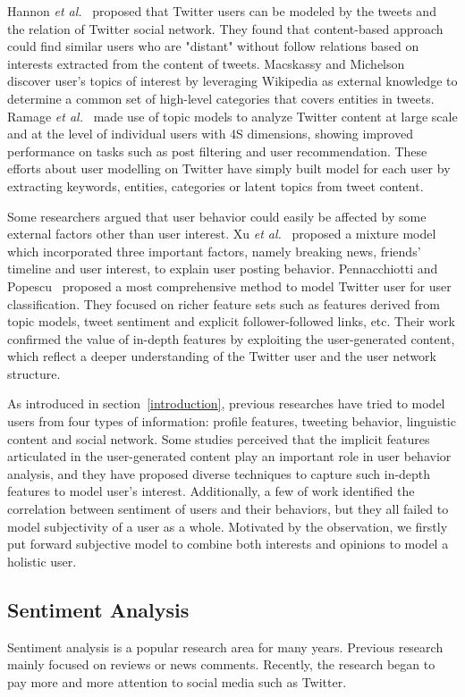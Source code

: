 \documentclass{acm_proc_article-sp}
\begin{document}
Hannon \emph{et al.}~\cite{Hannon:2010} proposed that Twitter users can be modeled by the tweets and the relation of Twitter social network.
They found that content-based approach could find similar users who are "distant" without follow relations based on interests extracted from the content of tweets. 
Macskassy and Michelson~\cite{conf/icwsm/MacskassyM11} discover user's topics of interest by leveraging Wikipedia as external knowledge to determine a common set of high-level categories that covers entities in tweets. 
Ramage \emph{et al.}~\cite{RamageEtAl:10} made use of topic models to analyze Twitter content at large scale and at the level of individual users with 4S dimensions, showing improved performance on tasks such as post filtering and user recommendation. 
These efforts about user modelling on Twitter have simply built model for each user by extracting keywords, entities, categories or latent topics from tweet content. 

Some researchers argued that user behavior could easily be affected by some external factors other than user interest.
Xu \emph{et al.}~\cite{Xu:2012MUP} proposed a mixture model which incorporated three important factors, namely breaking news, friends' timeline and user interest, to explain user posting behavior.
Pennacchiotti and Popescu~\cite{Pennacchiotti:icwsm11} proposed a most comprehensive method to model Twitter user for user classification. They focused on richer feature sets such as features derived from topic models, tweet sentiment and explicit follower-followed links, etc.
Their work confirmed the value of in-depth features by exploiting the user-generated content, which reflect a deeper understanding of the Twitter user and the user network structure.

As introduced in section~\ref{introduction}, previous researches have tried to model users from four types of information: profile features, tweeting behavior, linguistic content and social network. 
Some studies perceived that the implicit features articulated in the user-generated content play an important role in user behavior analysis, and they have proposed diverse techniques to capture such in-depth features to model user's interest. 
Additionally, a few of work identified the correlation between sentiment of users and their behaviors, but they all failed to model subjectivity of a user as a whole.
Motivated by the observation, we firstly put forward subjective model to combine both interests and opinions to model a holistic user.

\subsection{Sentiment Analysis}
Sentiment analysis is a popular research area for many years. Previous research mainly focused on reviews or news comments. 
Recently, the research began to pay more and more attention to social media such as Twitter.
 
\end{document}
